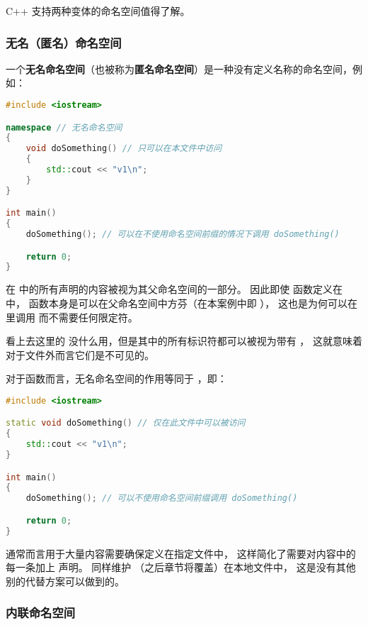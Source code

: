 \documentclass[../../LearnCpp.tex]{subfiles}
\begin{document}

C++ 支持两种变体的命名空间值得了解。

\subsubsection*{无名（匿名）命名空间}

一个\textbf{无名命名空间}（也被称为\textbf{匿名命名空间}）是一种没有定义名称的命名空间，例如：

\begin{lstlisting}[language=C++]
#include <iostream>

namespace // 无名命名空间
{
    void doSomething() // 只可以在本文件中访问
    {
        std::cout << "v1\n";
    }
}

int main()
{
    doSomething(); // 可以在不使用命名空间前缀的情况下调用 doSomething()

    return 0;
}
\end{lstlisting}

在  中的所有声明的内容被视为其父命名空间的一部分。
因此即使  函数定义在  中，
函数本身是可以在父命名空间中方芬（在本案例中即 ），
这也是为何可以在  里调用  而不需要任何限定符。

看上去这里的  没什么用，但是其中的所有标识符都可以被视为带有 ，
这就意味着对于文件外而言它们是不可见的。

对于函数而言，无名命名空间的作用等同于 ，即：

\begin{lstlisting}[language=C++]
#include <iostream>

static void doSomething() // 仅在此文件中可以被访问
{
    std::cout << "v1\n";
}

int main()
{
    doSomething(); // 可以不使用命名空间前缀调用 doSomething()

    return 0;
}
\end{lstlisting}

 通常而言用于大量内容需要确保定义在指定文件中，
这样简化了需要对内容中的每一条加上  声明。
 同样维护 （之后章节将覆盖）在本地文件中，
这是没有其他别的代替方案可以做到的。

\subsubsection*{内联命名空间}
\end{document}

